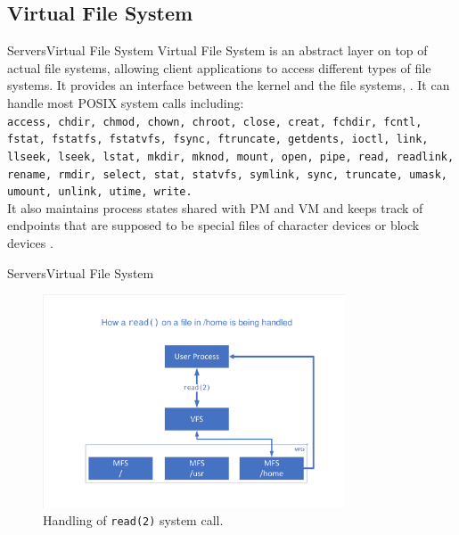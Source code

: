 \documentclass[12pt]{beamer}
\begin{document}
\subsection{Virtual File System}
\begin{frame}{Servers}{Virtual File System}
    Virtual File System is an abstract layer on top of actual file systems, allowing client applications to access different types of file systems. It provides an interface between the kernel and the file systems, \cite{vfswikipedia}. It can handle most POSIX system calls including:\\    \texttt{access, chdir, chmod, chown, chroot, close, creat, fchdir, fcntl, fstat, fstatfs, fstatvfs, fsync, ftruncate, getdents, ioctl, link, llseek, lseek, lstat, mkdir, mknod, mount, open, pipe, read, readlink, rename, rmdir, select, stat, statvfs, symlink, sync, truncate, umask, umount, unlink, utime, write.}\\
    It also maintains process states shared with PM and VM and keeps track of endpoints that are supposed to be special files of character devices or block devices \cite{vfsinternal}.
\end{frame}
\begin{frame}{Servers}{Virtual File System}
\begin{figure}[H]
    \centering
    \includegraphics[width=0.8\textwidth]{1.pdf}
    \caption{Handling of \texttt{read(2)} system call.}
\end{figure}
\end{frame}
\end{document}
